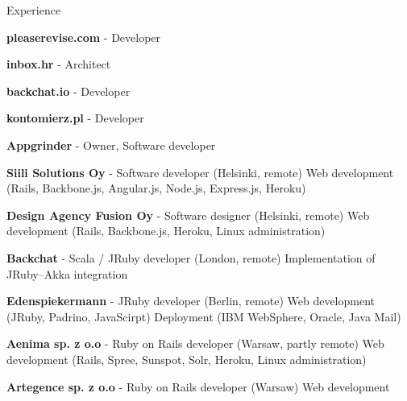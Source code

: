 
\begin{rubric}{Experience}


\entry*[01.2013--\ldots]
  \textbf{pleaserevise.com} - Developer

\entry*[10.2012--\ldots]
  \textbf{inbox.hr} - Architect

\entry*[12.2011--01.2012]
  \textbf{backchat.io} - Developer

\entry*[03.2010--10.2010]
  \textbf{kontomierz.pl} - Developer


\entry*[10.2010--\ldots]
  \textbf{Appgrinder} - Owner, Software developer

\entry*[07.2012--02.2013]
  \textbf{Siili Solutions Oy} - Software developer (Helsinki, remote)
\entry*
  Web development (Rails, Backbone.js, Angular.js, Node.js, Express.js, Heroku)

\entry*[07.2011--06.2012]
  \textbf{Design Agency Fusion Oy} - Software designer (Helsinki, remote)
\entry*
  Web development (Rails, Backbone.js, Heroku, Linux administration)

\entry*[12.2011--01.2012]
  \textbf{Backchat} - Scala / JRuby developer (London, remote)
\entry*
  Implementation of JRuby--Akka integration

\entry*[03.2011--05.2011]
  \textbf{Edenspiekermann} - JRuby developer (Berlin, remote)
\entry*
  Web development (JRuby, Padrino, JavaScirpt)
\entry*
  Deployment (IBM WebSphere, Oracle, Java Mail)

\entry*[10.2010--06.2011]
  \textbf{Aenima sp. z o.o} - Ruby on Rails developer (Warsaw, partly remote)
\entry*
  Web development (Rails, Spree, Sunspot, Solr, Heroku, Linux administration)

\entry*[03.2010--10.2010]
  \textbf{Artegence sp. z o.o} - Ruby on Rails developer (Warsaw)
\entry*
  Web development

\end{rubric}
